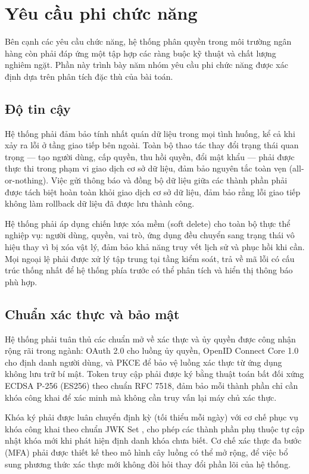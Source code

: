 \documentclass[../DoAn.tex]{subfiles}
\begin{document}
\section{Yêu cầu phi chức năng}
\label{section:2.4}

Bên cạnh các yêu cầu chức năng, hệ thống phân quyền trong môi trường ngân hàng còn phải đáp ứng một tập hợp các ràng buộc kỹ thuật và chất lượng nghiêm ngặt. Phần này trình bày năm nhóm yêu cầu phi chức năng được xác định dựa trên phân tích đặc thù của bài toán.

\subsection{Độ tin cậy}
\label{subsection:2.4.1}

Hệ thống phải đảm bảo tính nhất quán dữ liệu trong mọi tình huống, kể cả khi xảy ra lỗi ở tầng giao tiếp bên ngoài. Toàn bộ thao tác thay đổi trạng thái quan trọng — tạo người dùng, cấp quyền, thu hồi quyền, đổi mật khẩu — phải được thực thi trong phạm vi giao dịch cơ sở dữ liệu, đảm bảo nguyên tắc toàn vẹn (all-or-nothing). Việc gửi thông báo và đồng bộ dữ liệu giữa các thành phần phải được tách biệt hoàn toàn khỏi giao dịch cơ sở dữ liệu, đảm bảo rằng lỗi giao tiếp không làm rollback dữ liệu đã được lưu thành công.

Hệ thống phải áp dụng chiến lược xóa mềm (soft delete) cho toàn bộ thực thể nghiệp vụ: người dùng, quyền, vai trò, ứng dụng đều chuyển sang trạng thái vô hiệu thay vì bị xóa vật lý, đảm bảo khả năng truy vết lịch sử và phục hồi khi cần. Mọi ngoại lệ phải được xử lý tập trung tại tầng kiểm soát, trả về mã lỗi có cấu trúc thống nhất để hệ thống phía trước có thể phân tích và hiển thị thông báo phù hợp.

\subsection{Chuẩn xác thực và bảo mật}
\label{subsection:2.4.2}

Hệ thống phải tuân thủ các chuẩn mở về xác thực và ủy quyền được công nhận rộng rãi trong ngành: OAuth 2.0 \cite{rfc6749} cho luồng ủy quyền, OpenID Connect Core 1.0 cho định danh người dùng, và PKCE \cite{rfc7636} để bảo vệ luồng xác thực từ ứng dụng không lưu trữ bí mật. Token truy cập phải được ký bằng thuật toán bất đối xứng ECDSA P-256 (ES256) theo chuẩn RFC 7518, đảm bảo mỗi thành phần chỉ cần khóa công khai để xác minh mà không cần truy vấn lại máy chủ xác thực.

Khóa ký phải được luân chuyển định kỳ (tối thiểu mỗi ngày) với cơ chế phục vụ khóa công khai theo chuẩn JWK Set \cite{rfc7517}, cho phép các thành phần phụ thuộc tự cập nhật khóa mới khi phát hiện định danh khóa chưa biết. Cơ chế xác thực đa bước (MFA) phải được thiết kế theo mô hình cây luồng có thể mở rộng, để việc bổ sung phương thức xác thực mới không đòi hỏi thay đổi phần lõi của hệ thống.
\end{document}
